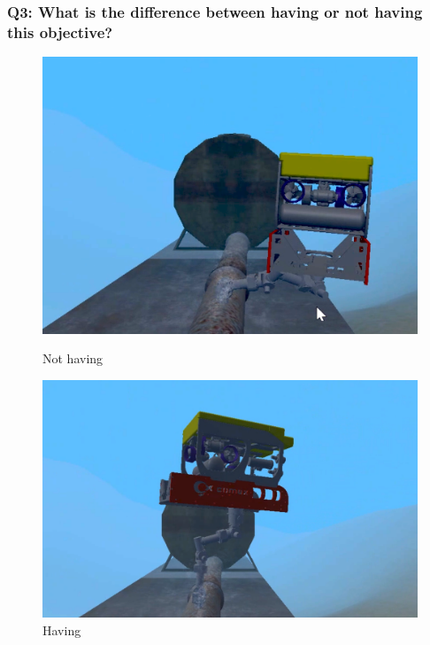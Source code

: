 \documentclass{article}
\begin{document}
\subsubsection{Q3: What is the difference between having or not having this objective?}

\begin{figure}[htp]
    \centering
    \begin{minipage}{0.50\textwidth}
    \includegraphics[scale=0.37]{513_comment.png}
    \caption{Not having}
    \end{minipage}
\hfill
    \centering
    \begin{minipage}{0.50\textwidth}
    \includegraphics[scale=0.3]{513_uncomment.png}
    \caption{Having}
    \end{minipage}
\end{figure}
\end{document}

